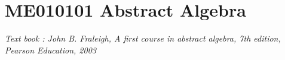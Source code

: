 
\chapter{ME010101 Abstract Algebra}
\textit{Text book : John B. Fraleigh, A first course in abstract algebra, 7th edition, Pearson Education, 2003}
